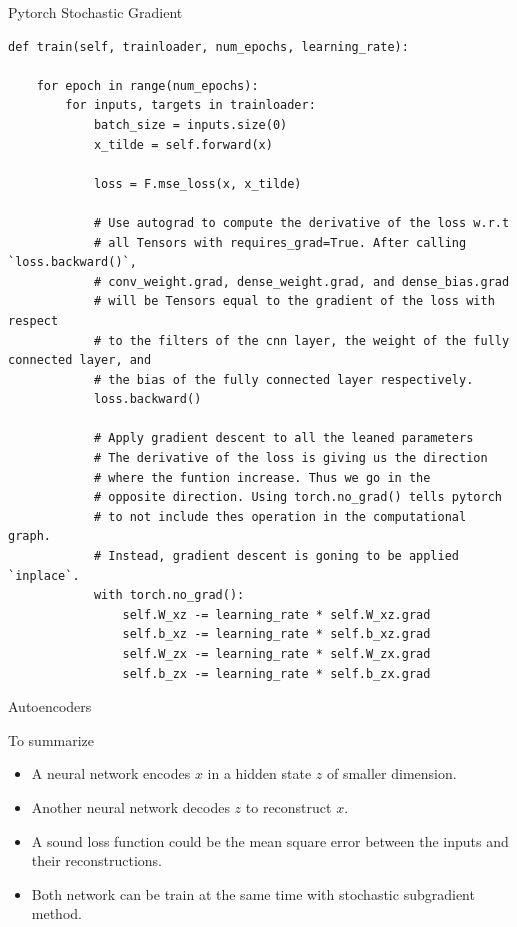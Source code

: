 \documentclass{beamer}
\begin{document}
\begin{frame}[fragile]{Pytorch Stochastic Gradient}
\begin{verbatim}
def train(self, trainloader, num_epochs, learning_rate):

    for epoch in range(num_epochs):
        for inputs, targets in trainloader:
            batch_size = inputs.size(0)
            x_tilde = self.forward(x)

            loss = F.mse_loss(x, x_tilde)

            # Use autograd to compute the derivative of the loss w.r.t 
            # all Tensors with requires_grad=True. After calling `loss.backward()`, 
            # conv_weight.grad, dense_weight.grad, and dense_bias.grad 
            # will be Tensors equal to the gradient of the loss with respect 
            # to the filters of the cnn layer, the weight of the fully connected layer, and 
            # the bias of the fully connected layer respectively.
            loss.backward()
            
            # Apply gradient descent to all the leaned parameters
            # The derivative of the loss is giving us the direction
            # where the funtion increase. Thus we go in the 
            # opposite direction. Using torch.no_grad() tells pytorch
            # to not include thes operation in the computational graph.
            # Instead, gradient descent is goning to be applied `inplace`.
            with torch.no_grad():
                self.W_xz -= learning_rate * self.W_xz.grad
                self.b_xz -= learning_rate * self.b_xz.grad
                self.W_zx -= learning_rate * self.W_zx.grad
                self.b_zx -= learning_rate * self.b_zx.grad
\end{verbatim}
\end{frame}

\begin{frame}{Autoencoders}

To summarize
\begin{itemize}
	\item A neural network encodes $x$ in a hidden state $z$ of smaller dimension.
	\item Another neural network decodes $z$ to reconstruct $x$.
	\item A sound loss function could be the mean square error between the inputs and their reconstructions.
	\item Both network can be train at the same time with stochastic subgradient method.
\end{itemize}
\end{frame}
\end{document}
